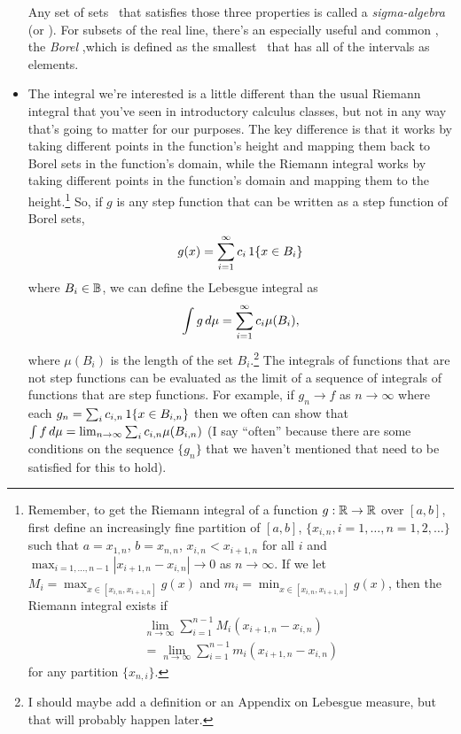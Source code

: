 \begin{itemize}[leftmargin=0pt]
  Any set of sets \BB\ that satisfies those three properties is called
  a \emph{sigma-algebra} (or \emph{\sigmaalgebra}).  For subsets of
  the real line, there's an especially useful and common
  \sigmaalgebra, the \emph{Borel \sigmaalgebra},which is defined as
  the smallest \sigmaalgebra\ that has all of the intervals as
  elements.

\item The integral we're interested is a little different than the
  usual Riemann integral that you've seen in introductory calculus
  classes, but not in any way that's going to matter for our purposes.
  The key difference is that it works by taking different points in
  the function's height and mapping them back to Borel sets in the
  function's domain, while the Riemann integral works by taking
  different points in the function's domain and mapping them to the
  height.\footnote{Remember, to get the Riemann integral of a function
  $g: \mathbb{R} \to \mathbb{R}$ over $[a,b]$, first define an increasingly fine
  partition of $[a,b]$, $\{x_{i,n}, i = 1,\dots,n = 1,2,\dots\}$ such that
  $a = x_{1,n}$, $b = x_{n,n}$, $x_{i,n} < x_{i+1,n}$ for all $i$
  and $\max_{i=1,\dots,n-1} |x_{i+1,n} - x_{i,n}| \to 0$ as $n \to \infty$.  If
  we let $M_i = \max_{x \in [x_{i,n}, x_{i+1,n}]} g(x)$ and $m_i =
  \min_{x \in [x_{i,n}, x_{i+1,n}]} g(x)$, then the Riemann integral
  exists if
  \begin{multline*}
    \lim_{n \to \infty} \sum_{i=1}^{n-1} M_i (x_{i+1,n} - x_{i,n}) \\
    = \lim_{n \to \infty} \sum_{i=1}^{n-1} m_i (x_{i+1,n} - x_{i,n})
  \end{multline*}
  for any partition $\{x_{n,i}\}$.} 
  So, if $g$ is any step function that can be written as a step
  function of Borel sets,
  \begin{equation*}
    g(x) = \sum_{i=1}^\infty c_i \operatorname{1}\{x \in B_i\}
  \end{equation*}
  where $B_i \in \mathbb{B}$, we can define the Lebesgue integral as
  \begin{equation*}
    \int g \,d\mu = \sum_{i=1}^\infty c_i \mu(B_i),
  \end{equation*}
  where $\mu(B_i)$ is the length of the set $B_i$.\footnote{I should
  maybe add a definition or an Appendix on Lebesgue measure, but
  that will probably happen later.}  The integrals of functions that
  are not step functions can be evaluated as the limit of a sequence
  of integrals of functions that are step functions.  For example, if
  $g_n \to f$ as $n \to \infty$ where each $g_n = \sum_i c_{i,n}
  \operatorname{1}\{x \in B_{i,n}\}$ then we often can show that $\int f \,d\mu =
  \lim_{n \to \infty} \sum_i c_{i,n} \mu(B_{i,n})$ (I say ``often''
  because there are some conditions on the sequence $\{g_n\}$ that we
  haven't mentioned that need to be satisfied for this to hold).


\end{itemize}
